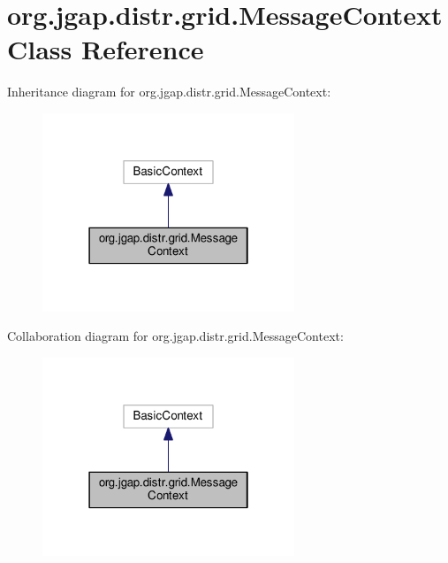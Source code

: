 \hypertarget{classorg_1_1jgap_1_1distr_1_1grid_1_1_message_context}{\section{org.\-jgap.\-distr.\-grid.\-Message\-Context Class Reference}
\label{classorg_1_1jgap_1_1distr_1_1grid_1_1_message_context}
}


Inheritance diagram for org.\-jgap.\-distr.\-grid.\-Message\-Context\-:
\nopagebreak
\begin{figure}[H]
\begin{center}
\leavevmode
\includegraphics[width=214pt]{classorg_1_1jgap_1_1distr_1_1grid_1_1_message_context__inherit__graph}
\end{center}
\end{figure}


Collaboration diagram for org.\-jgap.\-distr.\-grid.\-Message\-Context\-:
\nopagebreak
\begin{figure}[H]
\begin{center}
\leavevmode
\includegraphics[width=214pt]{classorg_1_1jgap_1_1distr_1_1grid_1_1_message_context__coll__graph}
\end{center}
\end{figure}
